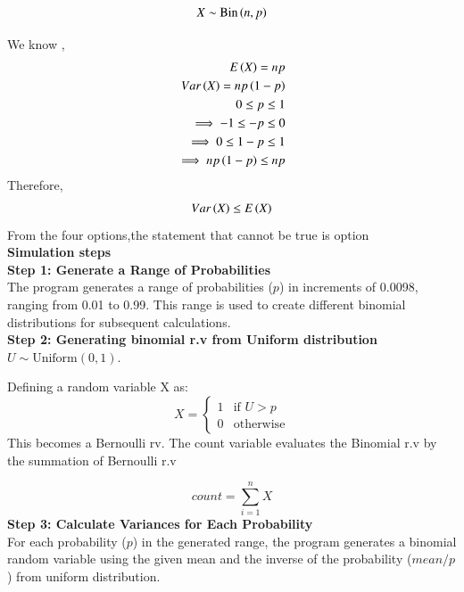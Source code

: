 \documentclass[journal,12pt,twocolumn]{IEEEtran}
\begin{document}
\solution
\begin{align}
X \sim \text{Bin}\left(n,p\right) \nonumber
\end{align}

We know ,
\begin{align} 
	E\left(X\right)=np\\
	Var\left(X\right)=np\left(1-p\right)\\
	0\leq p\leq1 \\
	\implies -1\leq -p \leq0\\
	\implies
	0 \leq 1-p \leq1\\
	\implies np\left(1-p\right)\leq np
\end{align}
Therefore,
\begin{align} 
	Var\left(X\right)\leq E\left(X\right)
\end{align}
From the four options,the statement that cannot be true is option \\

\textbf{Simulation steps}\\
\textbf{Step 1: Generate a Range of Probabilities}\\
The program generates a range of probabilities (\(p\)) in increments of 0.0098, ranging from 0.01 to 0.99. This range is used to create different binomial distributions for subsequent calculations.
\\
\textbf{Step 2: Generating binomial r.v from Uniform distribution}\\
\( U \sim \text{Uniform}(0, 1) \).

Defining a random variable X as:
\[
X = 
\begin{cases}
    1 & \text{if } U > p \\
    0 & \text{otherwise}
\end{cases}
\]
This becomes a Bernoulli rv.
The count variable evaluates the Binomial r.v by the summation of Bernoulli r.v

\[
count= \sum_{i=1}^{n} X
\]
\textbf{Step 3: Calculate Variances for Each Probability}\\
For each probability (\(p\)) in the generated range, the program generates a binomial random variable using the given mean and the inverse of the probability (\(mean/p\)) from uniform distribution.
\end{document}
